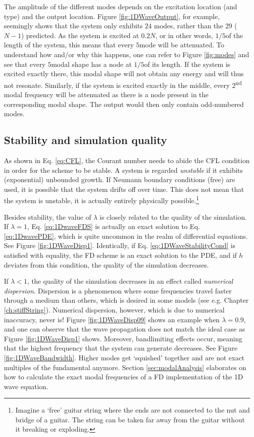 The amplitude of the different modes depends on the excitation location (and type) and the output location. 
Figure \ref{fig:1DWaveOutput}, for example, seemingly shows that the system only exhibits $24$ modes, rather than the $29$ ($N-1$) predicted. As the system is excited at $0.2N$, or in other words, $1/5$\th of the length of the system, this means that every $5$\th mode will be attenuated.
To understand how and/or why this happens, one can refer to Figure \ref{fig:modes} and see that every $5$\th modal shape has a node at $1/5$\th of its length. If the system is excited exactly there, this modal shape will not obtain any energy and will thus not resonate. Similarly, if the system is excited exactly in the middle, every 2\textsuperscript{nd} modal frequency will be attenuated as there is a node present in the corresponding modal shape. The output would then only contain odd-numbered modes. 

\subsection{Stability and simulation quality}\label{sec:quality1DWave}
As shown in Eq. \eqref{eq:CFL}, the Courant number needs to abide the CFL condition in order for the scheme to be stable. A system is regarded \textit{unstable} if it exhibits (exponential) unbounded growth. If Neumann boundary conditions (free) are used, it is possible that the system drifts off over time. This does not mean that the system is unstable, it is actually entirely physically possible.\footnote{Imagine a `free' guitar string where the ends are not connected to the nut and bridge of a guitar. The string can be taken far away from the guitar without it breaking or exploding.}

Besides stability, the value of $\lambda$ is closely related to the quality of the simulation. 
If $\lambda = 1$, Eq. \eqref{eq:1DwaveFDS} is actually an exact solution to Eq. \eqref{eq:1DwavePDE}, which is quite uncommon in the realm of differential equations. See Figure \ref{fig:1DWaveDisp1}. Identically, if Eq. \eqref{eq:1DWaveStabilityCond} is satisfied with equality, the FD scheme is an exact solution to the PDE, and if $h$ deviates from this condition, the quality of the simulation decreases. 

If $\lambda < 1$, the quality of the simulation decreases in an effect called \textit{numerical dispersion}. Dispersion is a phenomenon where some frequencies travel faster through a medium than others, which is desired in some models (see e.g. Chapter \ref{ch:stiffString}). Numerical dispersion, however, which is due to numerical inaccuracy, never is! Figure \ref{fig:1DWaveDisp09} shows an example when $\lambda = 0.9$, and one can observe that the wave propagation does not match the ideal case as Figure \ref{fig:1DWaveDisp1} shows. Moreover, bandlimiting effects occur, meaning that the highest frequency that the system can generate decreases. See Figure \ref{fig:1DWaveBandwidth}. Higher modes get `squished' together and are not exact multiples of the fundamental anymore. Section \ref{sec:modalAnalysis} elaborates on how to calculate the exact modal frequencies of a FD implementation of the 1D wave equation.

